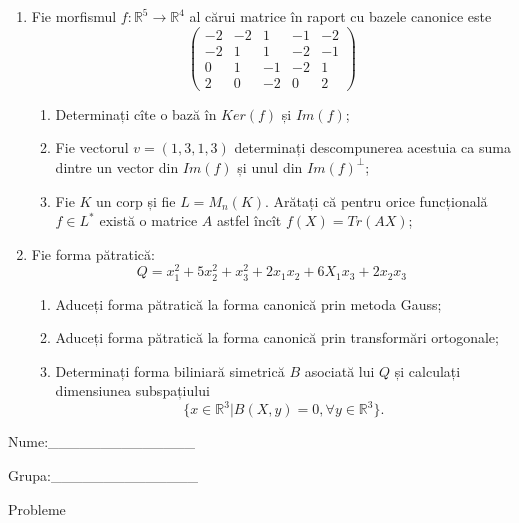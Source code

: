 \documentclass{article}
\begin{document}
\begin{enumerate}
 \item Fie morfismul $f:\mathbb{R}^5 \to \mathbb{R}^4$ al cărui matrice în raport cu bazele canonice este
$$\begin{pmatrix}
-2&-2&1&-1&-2\\
-2&1&1&-2&-1\\
0&1&-1&-2&1\\
2&0&-2&0&2
\end{pmatrix}$$

\begin{enumerate}
\item Determinați cîte o bază în $Ker(f)$ și $Im(f)$;
\item Fie vectorul $v=(1,3,1,3)$ determinați descompunerea acestuia ca suma dintre un vector din $Im(f)$ și unul din $Im(f)^\perp$;
\item Fie $K$ un corp și fie $L=M_n(K)$. Arătați că pentru orice funcțională $f \in L^*$ există o matrice $A$ astfel încît $f(X)=Tr(AX)$;
\end{enumerate}
\item Fie forma pătratică:
$$Q= x_1^2+5x_2^2+x_3^2+2x_1x_2+6X_1x_3+2x_2x_3$$

\begin{enumerate}
\item Aduceți forma pătratică la forma canonică prin metoda Gauss;
\item Aduceți forma pătratică la forma canonică prin transformări ortogonale;
\item Determinați forma biliniară simetrică $B$ asociată lui $Q$ și calculați dimensiunea subspațiului
$$\{x \in \mathbb{R}^3 | B(X,y)=0,\forall y \in \mathbb{R}^3\}.$$

\end{enumerate}
\end{enumerate}
\newpage
\begin{flushright}
Nume:\_\_\_\_\_\_\_\_\_\_\_\_\_\_
 
 
Grupa:\_\_\_\_\_\_\_\_\_\_\_\_\_\_
\end{flushright}
\begin{center}
\vspace{2cm}
{\Large Probleme}
\vspace{2cm}
\end{center}
\end{document}
